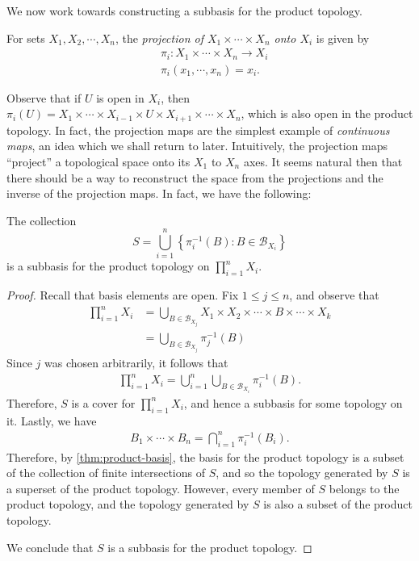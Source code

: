We now work towards constructing a subbasis for the product topology.
\begin{definition}
	\label{def:projection}
	For sets $X_{1},X_{2}, \cdots, X_{n}$, the \emph{projection of
	$X_{1} \times \cdots \times X_{n}$ onto $X_{i}$} is given by
	\begin{align*}
		& \pi_{i}: X_{1} \times \cdots \times X_{n} \to X_{i} \\
		& \pi_{i}(x_{1}, \cdots, x_{n}) = x_{i}.
	\end{align*}
\end{definition}
Observe that if $U$ is open in $X_{i}$, then $\pi_{i}(U) = X_{1} \times \cdots
\times X_{i-1} \times U \times X_{i+1} \times \cdots \times X_{n}$, which is
also open in the product topology. In fact, the projection maps are the
simplest example of \emph{continuous maps}, an idea which we shall return to
later. Intuitively, the projection maps ``project'' a topological space onto its
$X_{1}$ to $X_{n}$ axes. It seems natural then that there should be a way to
reconstruct the space from the projections and the inverse of the projection
maps. In fact, we have the following:
\begin{theorem}
	\label{thm:proj-subbasis}
	The collection
	\begin{equation*}
		S = \bigcup_{i=1}^{n} \left\{ \pi_{i}^{-1}(B): B \in \mathcal{B}_{X_{i}} \right\}
	\end{equation*}
	is a subbasis for the product topology on $\prod_{i=1}^{n} X_{i}$.
\end{theorem}
\begin{proof}
	Recall that basis elements are open. Fix $1 \le j \le n$, and observe that
	\begin{align*}
		\prod_{i=1}^{n} X_{i}
		&= \bigcup_{B \in
		\mathcal{B}_{X_{j}}}X_{1} \times X_{2} \times \cdots \times B \times
		\cdots \times X_{k} \\
		&= \bigcup_{B \in \mathcal{B}_{X_{j}}} \pi_{j}^{-1}(B)
	\end{align*}
	Since $j$ was chosen arbitrarily, it follows that
	\begin{align*}
		\prod_{i=1}^{n} X_{i} = \bigcup_{i=1}^{n} \bigcup_{B \in
		\mathcal{B}_{X_{i}}} \pi_{i}^{-1}(B).
	\end{align*}
	Therefore, $S$ is a cover for $\prod_{i=1}^{n} X_{i}$, and hence a subbasis
	for some topology on it.
	Lastly, we have
	\begin{align*}
		B_{1} \times \cdots \times B_{n} = \bigcap_{i=1}^{n} \pi_{i}^{-1}(B_{i}).
	\end{align*}
	Therefore, by \cref{thm:product-basis}, the basis for the product topology is
	a subset of the collection of finite intersections of $S$, and so the topology
	generated by $S$ is a superset of the product topology. However, every member
	of $S$ belongs to the product topology, and the topology generated by $S$ is
	also a subset of the product topology.

	We conclude that $S$ is a subbasis for the product topology.
\end{proof}
